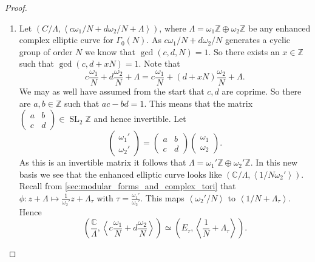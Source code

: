 \documentclass[titlepage,a4paper]{article}
\theoremstyle{theoremdd}
\theoremstyle{definitiondd}
\theoremstyle{remarkdd}
\newcommand{\Z}{\mathbb{Z}}
\newcommand{\C}{\mathbb{C}}
\DeclareMathOperator{\SL}{SL}
\begin{document}
\begin{proof}
	\begin{enumerate}
		\item Let $\left( C / \Lambda, \left< c \omega_1 / N  + d \omega_2 / N  + \Lambda\right> \right) $, where $\Lambda = \omega_1 \Z \oplus \omega_2 \Z$ be any enhanced complex elliptic curve for $\Gamma_0(N)$.
			As $c \omega_1 / N + d \omega_2 /N$ generates a cyclic group of order $N$ we know that $\gcd(c, d, N) = 1$. 
			So there exists an $x \in \Z$ such that $\gcd(c, d + xN) = 1$. 
			Note that \[
				c \frac{\omega_1}{N}  + d \frac{\omega_2}{N}  + \Lambda =  c \frac{\omega_1}{N} + (d + xN) \frac{\omega_2}{N}+ \Lambda
		.\]
		We may as well have assumed from the start that $c, d$ are coprime.
		So there are $a, b \in \Z $ such that $ac - bd = 1$. 
		This means that the matrix  $\begin{pmatrix} a & b \\ c& d \end{pmatrix}  \in \SL_2\Z$ and hence invertible. 
		Let \[
		\begin{pmatrix} \omega_1' \\ \omega_2' \end{pmatrix}  = 
		\begin{pmatrix} a & b \\ c & d \end{pmatrix} 
		\begin{pmatrix} \omega_1 \\ \omega_2 \end{pmatrix} 
		.\] 
		As this is an invertible matrix it follows that $\Lambda = \omega_1' \Z \oplus \omega_2' \Z$. 
	In this new basis we see that the enhanced elliptic curve looks like $(\C / \Lambda, \left< 1 / N \omega_2'\right>)$.
	Recall from \cref{sec:modular_forms_and_complex_tori} that  $\phi: z  + \Lambda \mapsto  \frac{1}{\omega_2'} z + \Lambda_\tau$ with $\tau = \frac{\omega_1'}{\omega_2'}$. 
	This maps  $\left<\omega_2' / N \right>$ to $\left<1 / N + \Lambda_\tau \right>$.
	Hence  \[
		\left( \frac{\C}{\Lambda}, \left<c \frac{\omega_1}{N} + d \frac{\omega_2}{N} \right> \right) 	\simeq  
		\left( E_\tau, \left<\frac{1}{N} + \Lambda_\tau \right> \right) 
	.\] 



\end{enumerate}
\end{proof}
\end{document}

